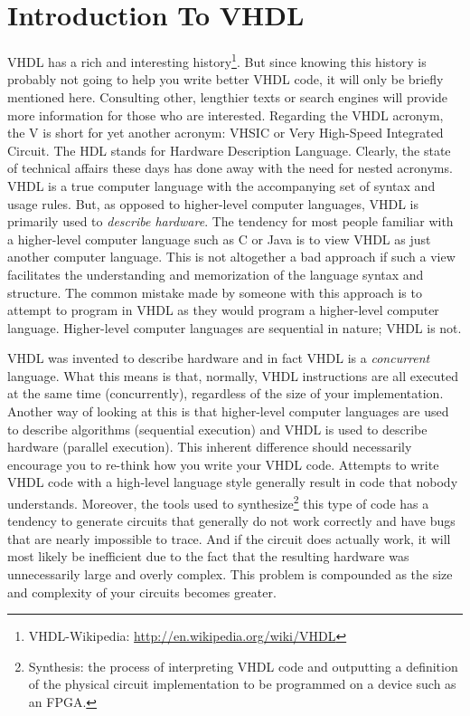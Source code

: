 %
%
\chapter{Introduction To VHDL}
VHDL has a rich and interesting history\footnote{VHDL-Wikipedia: {\footnotesize\url{http://en.wikipedia.org/wiki/VHDL}}}. But since knowing this history is probably not going to help you write better VHDL code, it will only be briefly mentioned here. Consulting other, lengthier texts or search engines will provide more information for those who are interested. Regarding the VHDL acronym,  the V is short for yet another acronym: VHSIC or Very High-Speed Integrated Circuit. The HDL stands for Hardware Description Language. Clearly, the state of technical affairs these days has done away with the need for nested acronyms. VHDL is a true computer language with the accompanying set of syntax and usage rules. But, as opposed to higher-level computer languages, VHDL is primarily used  to \textit{describe hardware}. The tendency for most people familiar with a higher-level computer language such as C or Java is to view VHDL as just another computer language. This is not altogether a bad approach if such a view facilitates the understanding and memorization of the language syntax and structure. The common mistake made by someone with this approach is to attempt to program in VHDL as they would program a higher-level computer language. Higher-level computer languages are sequential in nature; VHDL is not.

VHDL was invented to describe hardware and in fact VHDL is a \textit{concurrent} language. What this means is that, normally, VHDL instructions are all executed at the same time (concurrently), regardless of the size of your implementation. Another way of looking at this is that higher-level computer languages are used to describe algorithms (sequential execution) and VHDL is used to describe hardware (parallel execution). This inherent difference should necessarily encourage you to re-think how you write your VHDL code. Attempts to write VHDL code with a high-level language style generally result in code that nobody understands. Moreover, the tools used to synthesize\footnote{Synthesis: the process of interpreting VHDL code and outputting a definition of the physical circuit implementation to be programmed on a device such as an FPGA.} this type of code has a tendency to generate circuits that generally do not work correctly and have bugs that are nearly impossible to trace. And if the circuit does actually work, it will most likely be inefficient due to the fact that the resulting hardware was unnecessarily large and overly complex. This problem is compounded as the size and complexity of your circuits becomes greater.

